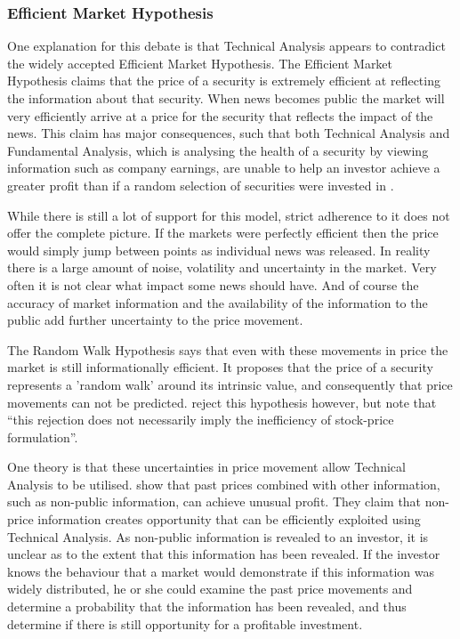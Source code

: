 \documentclass{article}
\begin{document}
\subsubsection{Efficient Market Hypothesis}

One explanation for this debate is that Technical Analysis appears to contradict the widely accepted Efficient Market Hypothesis. The Efficient Market Hypothesis claims that the price of a security is extremely efficient at reflecting the information about that security. When news becomes public the market will very efficiently arrive at a price for the security that reflects the impact of the news. This claim has major consequences, such that both Technical Analysis and Fundamental Analysis, which is analysing the health of a security by viewing information such as company earnings, are unable to help an investor achieve a greater profit than if a random selection of securities were invested in \citep{emhAndCritics}. 

While there is still a lot of support for this model, strict adherence to it does not offer the complete picture. If the markets were perfectly efficient then the price would simply jump between points as individual news was released. In reality there is a large amount of noise, volatility and uncertainty in the market. Very often it is not clear what impact some news should have. And of course the accuracy of market information and the availability of the information to the public add further uncertainty to the price movement.

The Random Walk Hypothesis says that even with these movements in price the market is still informationally efficient. It proposes that the price of a security represents a 'random walk' around its intrinsic value, and consequently that price movements can not be predicted. \cite{lo1988} reject this hypothesis however, but note that ``this rejection does not necessarily imply the inefficiency of stock-price formulation''.

One theory is that these uncertainties in price movement allow Technical Analysis to be utilised. \cite{indefenseof} show that past prices combined with other information, such as non-public information, can achieve unusual profit. They claim that non-price information creates opportunity that can be efficiently exploited using Technical Analysis. As non-public information is revealed to an investor, it is unclear as to the extent that this information has been revealed. If the investor knows the behaviour that a market would demonstrate if this information was widely distributed, he or she could examine the past price movements and determine a probability that the information has been revealed, and thus determine if there is still opportunity for a profitable investment.
\end{document}
